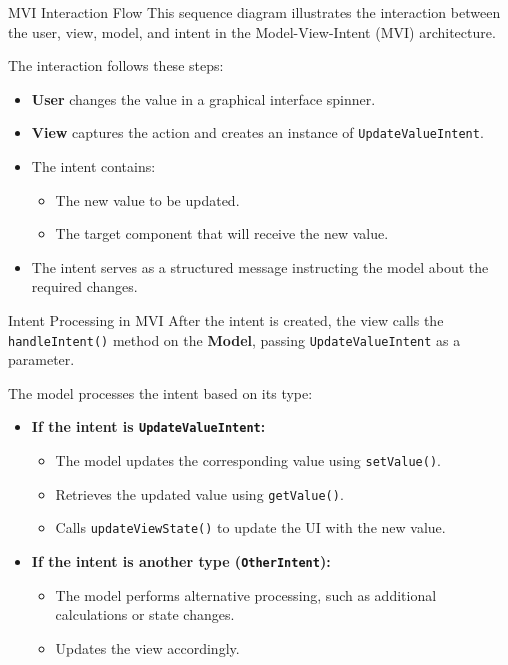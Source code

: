 \documentclass[aspectratio=169, table]{beamer}
\begin{document}
\begin{frame}[fragile]{MVI Interaction Flow}
	\vspace{20pt}
	This sequence diagram illustrates the interaction between the user, view, model, and intent in the Model-View-Intent (MVI) architecture.
	
	The interaction follows these steps:
	\begin{itemize}
		\item \textbf{User} changes the value in a graphical interface spinner.
		\item \textbf{View} captures the action and creates an instance of \texttt{UpdateValueIntent}.
		\item The intent contains:
		\begin{itemize}
			\item The new value to be updated.
			\item The target component that will receive the new value.
		\end{itemize}
		\item The intent serves as a structured message instructing the model about the required changes.
	\end{itemize}
\end{frame}

\begin{frame}[fragile]{Intent Processing in MVI}
	\vspace{20pt}
	After the intent is created, the view calls the \texttt{handleIntent()} method on the \textbf{Model}, passing \texttt{UpdateValueIntent} as a parameter.
	
	The model processes the intent based on its type:
	\begin{itemize}
		\item \textbf{If the intent is \texttt{UpdateValueIntent}:}
		\begin{itemize}
			\item The model updates the corresponding value using \texttt{setValue()}.
			\item Retrieves the updated value using \texttt{getValue()}.
			\item Calls \texttt{updateViewState()} to update the UI with the new value.
		\end{itemize}
		\item \textbf{If the intent is another type (\texttt{OtherIntent}):}
		\begin{itemize}
			\item The model performs alternative processing, such as additional calculations or state changes.
			\item Updates the view accordingly.
		\end{itemize}
	\end{itemize}
\end{frame}
\end{document}
